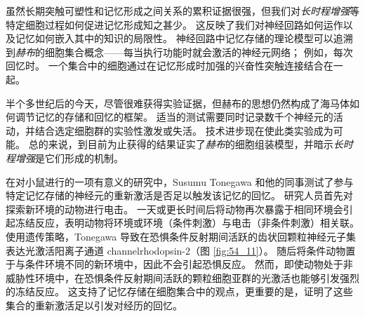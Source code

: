 虽然长期突触可塑性和记忆形成之间关系的累积证据很强，但我们对\textit{长时程增强}等特定细胞过程如何促进记忆形成知之甚少。
这反映了我们对神经回路如何运作以及记忆如何嵌入其中的知识的局限性。
神经回路中记忆存储的理论模型可以追溯到\textit{赫布}的细胞集合概念——每当执行功能时就会激活的神经元网络；
例如，每次回忆时。
一个集合中的细胞通过在记忆形成时加强的兴奋性突触连接结合在一起。


半个多世纪后的今天，尽管很难获得实验证据，但赫布的思想仍然构成了海马体如何调节记忆的存储和回忆的框架。
适当的测试需要同时记录数千个神经元的活动，并结合选定细胞群的实验性激发或失活。
技术进步现在使此类实验成为可能。
总的来说，到目前为止获得的结果证实了\textit{赫布}的细胞组装模型，并暗示\textit{长时程增强}是它们形成的机制。


在对小鼠进行的一项有意义的研究中，Susumu Tonegawa 和他的同事测试了参与特定记忆存储的神经元的重新激活是否足以触发该记忆的回忆。
研究人员首先对探索新环境的动物进行电击。
一天或更长时间后将动物再次暴露于相同环境会引起冻结反应，表明动物将环境或环境（条件刺激）与电击（非条件刺激）相关联。
使用遗传策略，Tonegawa 导致在恐惧条件反射期间活跃的齿状回颗粒神经元子集表达光激活阳离子通道 channelrhodopsin-2（图 \ref{fig:54_11}）。
随后将条件动物置于与条件环境不同的新环境中，因此不会引起恐惧反应。
然而，即使动物处于非威胁性环境中，在恐惧条件反射期间活跃的颗粒细胞亚群的光激活也能够引发强烈的冻结反应。
这支持了记忆存储在细胞集合中的观点，更重要的是，证明了这些集合的重新激活足以引发对经历的回忆。


